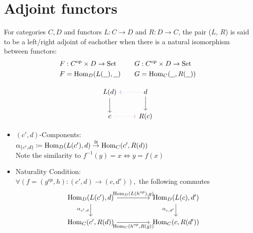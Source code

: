 \section{Adjoint functors}

\begin{definition}\label{def:adjoint_hom}
  For categories $C, D$ and functors $L: C\to D$ and $R: D\to C$, the pair ($L$,
  $R$) is said to be a left/right adjoint of eachother when there is a natural
  isomorphism between functors: \parencite{fong_spivak:7sketches}
  \[
    \begin{aligned}
      F&: C^{\mathrm{op}} \times D \to \mathrm{Set}\\
      F&=\mathrm{Hom}_D(L(\underline{\ \ }), \underline{\ \ })
    \end{aligned}
    \qquad
    \begin{aligned}
      G&: C^{\mathrm{op}} \times D \to \mathrm{Set}\\
      G&=\mathrm{Hom}_C(\underline{\ \ }, R(\underline{\ \ }))
    \end{aligned}
  \]

  \[\begin{tikzcd}
    {L(d)} & d \\
    c & {R(c)}
    \arrow[from=1-2, to=2-2]
    \arrow[from=1-1, to=2-1]
    \arrow[draw={rgb,255:red,92;green,92;blue,214}, dotted, from=1-2, to=1-1]
    \arrow[draw={rgb,255:red,214;green,92;blue,92}, dotted, from=2-1, to=2-2]
  \end{tikzcd}\]

  \begin{itemize}
    \item $(c', d)$-Components:\\
      $\alpha_{(c', d)} \coloneqq \mathrm{Hom}_D(L(c'), d)
      \overset{\cong}{\to} \mathrm{Hom}_C(c', R(d))$\\
      Note the similarity to $f^{-1}(y)=x \iff y=f(x)$
    \item Naturality Condition:\\
      $\forall (f = (g^{op}, h): (c', d) \to (c, d')),$
      the following commutes
      \[\begin{tikzcd}
        {\Hom_D(L(c'), d)} && {\Hom_D(L(c),d')} \\
        {\Hom_C(c', R(d))} && {\Hom_C(c,R(d'))}
        \arrow["{\alpha_{c',d}}"', from=1-1, to=2-1]
        \arrow["{\alpha_{c,d'}}"', from=1-3, to=2-3]
        \arrow["{\Hom_D(L(h^{op}), g)}", from=1-1, to=1-3]
        \arrow["{\Hom_C(h^{op}, R(g))}"', from=2-1, to=2-3]
      \end{tikzcd}\]
  \end{itemize}
\end{definition}

